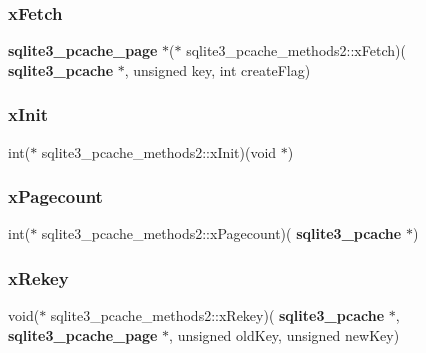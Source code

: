 \mbox{\label{structsqlite3__pcache__methods2_ac74dd2b35193a4309494311995da2d25}} 
\subsubsection{xFetch}
{\footnotesize\ttfamily \textbf{ sqlite3\+\_\+pcache\+\_\+page} $\ast$($\ast$ sqlite3\+\_\+pcache\+\_\+methods2\+::x\+Fetch)(\textbf{ sqlite3\+\_\+pcache} $\ast$, unsigned key, int create\+Flag)}

\mbox{\label{structsqlite3__pcache__methods2_a8f77114458576c9d75cd53822fcd3462}} 
\subsubsection{xInit}
{\footnotesize\ttfamily int($\ast$ sqlite3\+\_\+pcache\+\_\+methods2\+::x\+Init)(void $\ast$)}

\mbox{\label{structsqlite3__pcache__methods2_a5d51aba3927db1da9acf31fbdf7d57b5}} 
\subsubsection{xPagecount}
{\footnotesize\ttfamily int($\ast$ sqlite3\+\_\+pcache\+\_\+methods2\+::x\+Pagecount)(\textbf{ sqlite3\+\_\+pcache} $\ast$)}

\mbox{\label{structsqlite3__pcache__methods2_a28a22927b108182e22025bbe6ba1f68e}} 
\subsubsection{xRekey}
{\footnotesize\ttfamily void($\ast$ sqlite3\+\_\+pcache\+\_\+methods2\+::x\+Rekey)(\textbf{ sqlite3\+\_\+pcache} $\ast$, \textbf{ sqlite3\+\_\+pcache\+\_\+page} $\ast$, unsigned old\+Key, unsigned new\+Key)}

\mbox{\label{structsqlite3__pcache__methods2_af00c121e9c39b1df292711013c226ba5}} 
